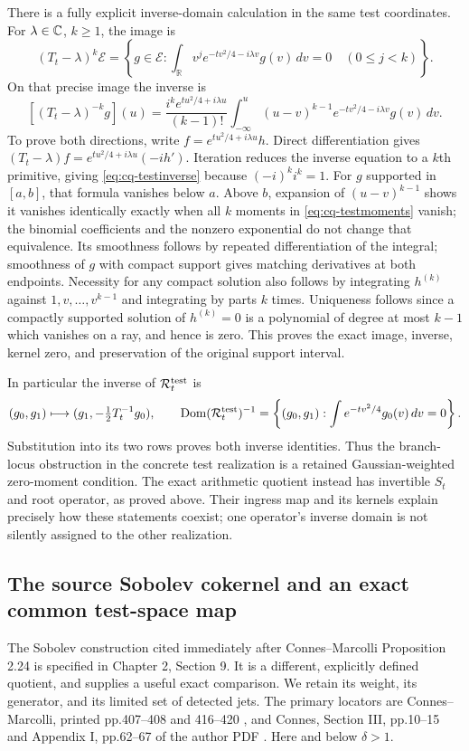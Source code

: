 There is a fully explicit inverse-domain calculation in the same
test coordinates. For $\lambda\in\mathbb C$, $k\geq1$, the image is
\begin{equation}\label{eq:cq-testmoments}
 (T_t-\lambda)^k\mathcal E
 =\left\{g\in\mathcal E:
 \int_{\mathbb R}v^j e^{-tv^2/4-i\lambda v}g(v)\,dv=0
                  \quad(0\leq j<k)\right\}.
\end{equation}
On that precise image the inverse is
\begin{equation}\label{eq:cq-testinverse}
 [(T_t-\lambda)^{-k}g](u)
 =\frac{i^ke^{tu^2/4+i\lambda u}}{(k-1)!}
 \int_{-\infty}^{u}(u-v)^{k-1}
            e^{-tv^2/4-i\lambda v}g(v)\,dv.
\end{equation}
To prove both directions, write
$f=e^{tu^2/4+i\lambda u}h$.
Direct differentiation gives
$(T_t-\lambda)f=e^{tu^2/4+i\lambda u}(-i h')$.
Iteration reduces the inverse equation to a $k$th primitive, giving
\eqref{eq:cq-testinverse} because $(-i)^ki^k=1$.
For $g$ supported in $[a,b]$, that formula vanishes below $a$.
Above $b$, expansion of $(u-v)^{k-1}$ shows it vanishes identically
exactly when all $k$ moments in \eqref{eq:cq-testmoments} vanish;
the binomial coefficients and the nonzero exponential do not change
that equivalence. Its smoothness follows by repeated differentiation
of the integral; smoothness of $g$ with compact support gives
matching derivatives at both endpoints. Necessity for any compact
solution also follows by integrating $h^{(k)}$ against
$1,v,\ldots,v^{k-1}$ and integrating by parts $k$ times.
Uniqueness follows since a compactly supported solution of
$h^{(k)}=0$ is a polynomial of degree at most $k-1$ which vanishes
on a ray, and hence is zero. This proves the exact image, inverse,
kernel zero, and preservation of the original support interval.

In particular the inverse of $\mathcal R_t^{\rm test}$ is
\[
 (g_0,g_1)\longmapsto(g_1,-\tfrac12T_t^{-1}g_0),
 \qquad
 \operatorname{Dom}(\mathcal R_t^{\rm test})^{-1}
 =\left\{(g_0,g_1):\int e^{-tv^2/4}g_0(v)\,dv=0\right\}.
\]
Substitution into its two rows proves both inverse identities.
Thus the branch-locus obstruction in the concrete test realization
is a retained Gaussian-weighted zero-moment condition. The exact
arithmetic quotient instead has invertible $S_t$ and root operator,
as proved above. Their ingress map and its kernels explain precisely
how these statements coexist; one operator's inverse domain is not
silently assigned to the other realization.

\subsection{The source Sobolev cokernel and an exact common test-space map}
\label{sec:cq-sobolev-comparison}
The Sobolev construction cited immediately after Connes--Marcolli
Proposition 2.24 is specified in Chapter 2, Section 9. It is a different,
explicitly defined quotient, and supplies a useful exact comparison.
We retain its weight, its generator, and its limited set of detected jets.
The primary locators are Connes--Marcolli, printed pp.407--408 and
416--420 \cite{cqCM}, and Connes, Section III, pp.10--15 and
Appendix I, pp.62--67 of the author PDF \cite{cqConnesSelecta}.
Here and below $\delta>1$.

